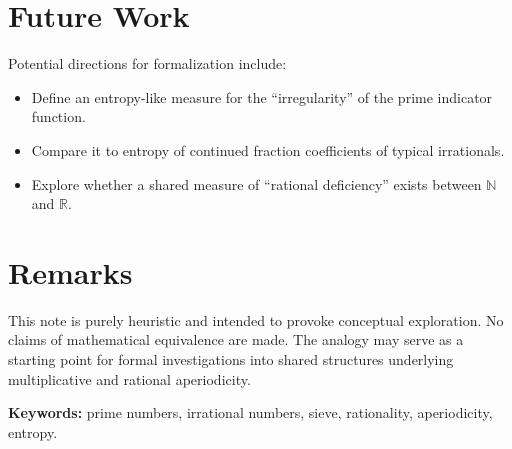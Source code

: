 \documentclass[12pt]{article}
\begin{document}
\section{Future Work}

Potential directions for formalization include:
\begin{itemize}
    \item Define an entropy-like measure for the ``irregularity'' of the prime indicator function.
    \item Compare it to entropy of continued fraction coefficients of typical irrationals.
    \item Explore whether a shared measure of ``rational deficiency'' exists between $\mathbb{N}$ and $\mathbb{R}$.
\end{itemize}

\section{Remarks}

This note is purely heuristic and intended to provoke conceptual exploration.  
No claims of mathematical equivalence are made.  
The analogy may serve as a starting point for formal investigations into shared structures underlying multiplicative and rational aperiodicity.

\vspace{1em}
\noindent\textbf{Keywords:} prime numbers, irrational numbers, sieve, rationality, aperiodicity, entropy.
\end{document}
